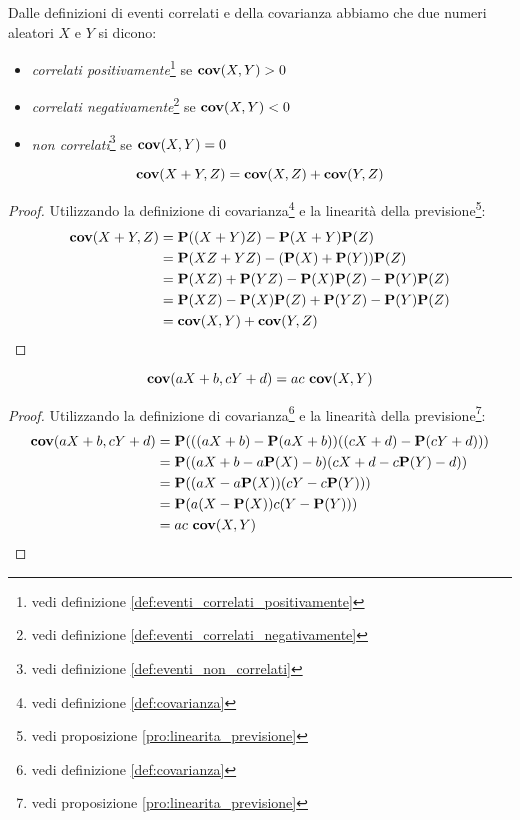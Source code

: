 \begin{proposition}
  Dalle definizioni di eventi correlati e della covarianza abbiamo che due numeri aleatori $X$ e $Y$ si dicono:
  \begin{itemize}
  \item \emph{correlati positivamente}\footnote{vedi definizione \ref{def:eventi_correlati_positivamente}} se \( \mathbf{cov}(X,Y) > 0 \)
  \item \emph{correlati negativamente}\footnote{vedi definizione \ref{def:eventi_correlati_negativamente}} se \( \mathbf{cov}(X,Y) < 0 \)
  \item \emph{non correlati}\footnote{vedi definizione \ref{def:eventi_non_correlati}} se \( \mathbf{cov}(X,Y) = 0 \)
  \end{itemize}
\end{proposition}

\begin{proposition}\label{def:bilinearita_della_covarianza}
  \[ \mathbf{cov}(X+Y,Z) = \mathbf{cov}(X,Z) + \mathbf{cov}(Y,Z) \]
\end{proposition}

\begin{proof}
  Utilizzando la definizione di covarianza\footnote{vedi definizione \ref{def:covarianza}} e la linearità della previsione\footnote{vedi proposizione \ref{pro:linearita_previsione}}:
  \begin{align*}
    \mathbf{cov}(X + Y,Z) &= \mathbf{P}((X+Y)Z) - \mathbf{P}(X+Y)\mathbf{P}(Z) \\
    &= \mathbf{P}(XZ + YZ) - (\mathbf{P}(X)+\mathbf{P}(Y))\mathbf{P}(Z) \\
    &= \mathbf{P}(XZ) + \mathbf{P}(YZ) - \mathbf{P}(X)\mathbf{P}(Z) - \mathbf{P}(Y)\mathbf{P}(Z) \\
    &= \mathbf{P}(XZ) - \mathbf{P}(X)\mathbf{P}(Z) + \mathbf{P}(YZ) - \mathbf{P}(Y)\mathbf{P}(Z) \\
    &= \mathbf{cov}(X,Y) + \mathbf{cov}(Y,Z)
  \end{align*}
\end{proof}

\begin{proposition}
  \label{pro:trasformazione_lineare_covarianza}
  \[ \mathbf{cov}(aX + b, cY + d) = ac ~ \mathbf{cov}(X,Y) \]
\end{proposition}

\begin{proof}
  Utilizzando la definizione di covarianza\footnote{vedi definizione \ref{def:covarianza}} e la linearità della previsione\footnote{vedi proposizione \ref{pro:linearita_previsione}}:
  \begin{align*}
    \mathbf{cov}(aX + b, cY + d) &= \mathbf{P}(((aX + b) - \mathbf{P}(aX + b))((cX + d) - \mathbf{P}(cY + d))) \\
    &= \mathbf{P}((aX + b - a\mathbf{P}(X) - b)(cX + d - c\mathbf{P}(Y) - d)) \\
    &= \mathbf{P}((aX - a\mathbf{P}(X))(cY - c\mathbf{P}(Y))) \\
    &= \mathbf{P}(a(X - \mathbf{P}(X)) c(Y - \mathbf{P}(Y))) \\
    &= ac ~ \mathbf{cov}(X,Y)
  \end{align*}
\end{proof}

